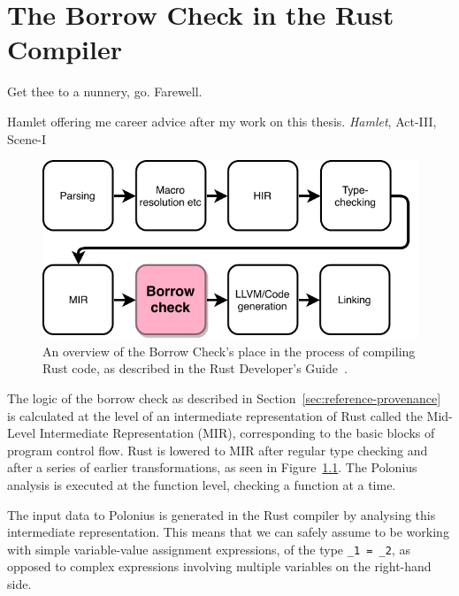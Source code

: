 \documentclass[11pt,a4paper,twoside,openany]{report}
\newcommand{\InRust}[1]{\texttt{#1}}
\begin{document}
\chapter{The Borrow Check in the Rust Compiler}\label{cha:borrow-check-compiler}
\epigraph{Get thee to a nunnery, go. Farewell.}%
{Hamlet offering me career advice after my work on this thesis. \textit{Hamlet},
  Act-III, Scene-I}

\begin{figure}[h!]
  \includegraphics[width=0.9\linewidth]{Graphs/rustc-overview}
  \caption[The Rust Compilation Process]{An overview of the Borrow Check's place
    in the process of compiling Rust code, as described in the Rust Developer's
    Guide~\cite{rustc_developers_guide_nodate}.}
  \label{fig:rustc-overview}
\end{figure}

The logic of the borrow check as described in
Section~\ref{sec:reference-provenance} is calculated at the level of an
intermediate representation of Rust called the Mid-Level Intermediate
Representation (MIR), corresponding to the basic blocks of program control flow.
Rust is lowered to MIR after regular type checking and after a series of earlier
transformations, as seen in Figure~\ref{fig:rustc-overview}. The Polonius
analysis is executed at the function level, checking a function at a time. 

The input data to Polonius is generated in the Rust compiler by analysing this
intermediate representation. This means that we can safely assume to be working
with simple variable-value assignment expressions, of the type \InRust{_1 = _2},
as opposed to complex expressions involving multiple variables on the right-hand
side.
\end{document}
